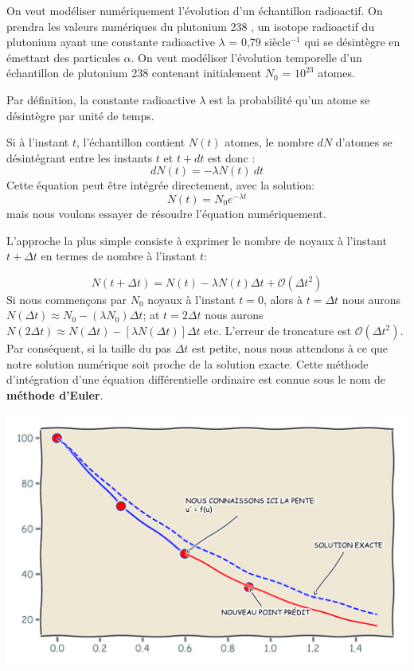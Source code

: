 \documentclass[%
oneside,                 %
final,                   %
10pt]{article}
\begin{document}
On veut modéliser numériquement l’évolution d’un échantillon radioactif. On prendra les valeurs numériques du plutonium 238 , un isotope radioactif du plutonium ayant une constante radioactive $\lambda$ = 0,79 siècle$^{-1}$ qui se désintègre en émettant des particules $\alpha$.
On veut modéliser l’évolution temporelle d’un échantillon de plutonium 238 contenant initialement $N_0$ = $10^{23}$ atomes.

Par définition, la constante radioactive $\lambda$ est la probabilité qu’un atome se désintègre par unité de temps.

Si à l’instant $t$, l’échantillon contient $N(t)$ atomes, le nombre $dN$ d’atomes se désintégrant entre les instants $t$ et $t + dt$ est donc :
\begin{equation}
dN(t) = - \lambda N(t) \ dt
\label{eq:desintegration_ode}
\end{equation}
Cette équation peut être intégrée directement, avec la solution:
\begin{equation}
N(t) = N_0 e^{-\lambda t}
\label{eq:desintegration_exact}
\end{equation}
mais nous voulons essayer de résoudre l'équation numériquement.

L'approche la plus simple consiste à exprimer le nombre de noyaux à l'instant $t + \Delta t$ en termes de nombre à l'instant $t$:

\begin{equation}
N(t + \Delta t) = N(t) - \lambda N(t) \Delta t + \mathcal{O}(\Delta t^2)
\label{eq:desintegration_euler}
\end{equation}
Si nous commençons par $N_0$ noyaux à l'instant $t = 0$, alors à $t = \Delta t$ nous aurons $N(\Delta t) \approx N_0 - (\lambda N_0) \Delta t$; at $t = 2 \Delta t$ nous aurons $N(2\Delta t) \approx N(\Delta t) - [\lambda N(\Delta t)] \Delta t$ etc.
L'erreur de troncature est $\mathcal{O}(\Delta t^2)$. Par conséquent, si la taille du pas $\Delta t$ est petite, nous nous attendons à ce que notre solution numérique soit proche de la solution exacte. Cette méthode d’intégration d’une équation différentielle ordinaire est connue sous le nom de \textbf{méthode d’Euler}.



\vspace{6mm}

\centerline{\includegraphics[width=0.7\linewidth]{scripts/euler_schema.pdf}}
\end{document}
